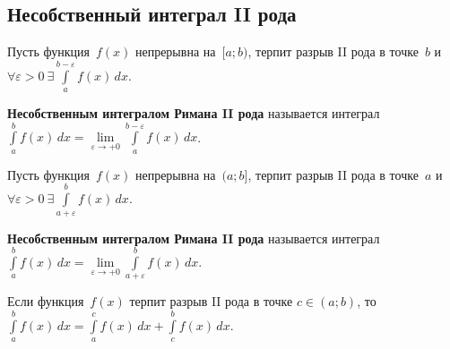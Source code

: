 \subsection{Несобственный интеграл II рода}
Пусть функция~$f(x)$ непрерывна на~$[a; b)$, терпит разрыв II рода в точке~$b$ и $\forall \varepsilon > 0 \ \exists \int\limits_a^{b-\varepsilon} f(x)\,dx$.

\textbf{Несобственным интегралом Римана II рода} называется интеграл $\int\limits_a^b f(x)\,dx = \lim\limits_{\varepsilon \to +0} \int\limits_a^{b-\varepsilon} f(x)\,dx$.

Пусть функция~$f(x)$ непрерывна на~$(a; b]$, терпит разрыв II рода в точке~$a$ и $\forall \varepsilon > 0 \ \exists \int\limits_{a+\varepsilon}^b f(x)\,dx$.

\textbf{Несобственным интегралом Римана II рода} называется интеграл $\int\limits_a^b f(x)\,dx = \lim\limits_{\varepsilon \to +0} \int\limits_{a+\varepsilon}^b f(x)\,dx$.

Если функция~$f(x)$ терпит разрыв II рода в точке $c \in (a; b)$, то $\int\limits_a^b f(x)\,dx = \int\limits_a^c f(x)\,dx + \int\limits_c^b f(x)\,dx$.